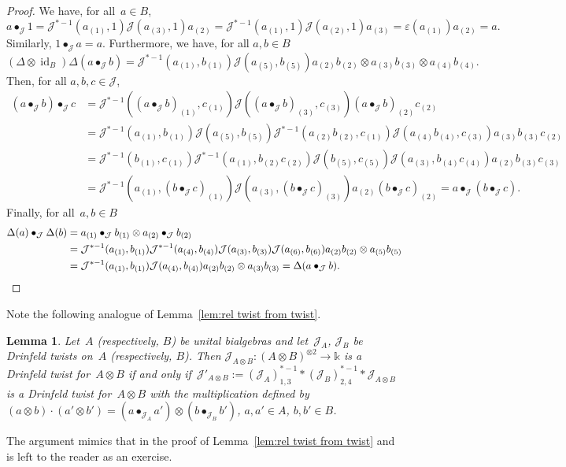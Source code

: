 \documentclass[12pt, reqno]{amsart}
\newtheorem{lemma}[theorem]{Lemma}
\theoremstyle{definition}
\numberwithin{equation}{section}
\newcommand{\tensor}{\otimes}
\newcommand{\kk}{\mathbb{k}}\newcommand{\lie}[1]{{\mathfrak{#1}}}
\DeclareMathOperator{\id}{id}
\begin{document}
\begin{proof}
We have, for all~$a\in B$,
$$
a\bullet_{\mathcal J}1=\mathcal J^{\ast-1}(a_{(1)},1)\mathcal J(a_{(3)},1)a_{(2)}
=\mathcal J^{\ast-1}(a_{(1)},1)\mathcal J(a_{(2)},1)a_{(3)}=\varepsilon(a_{(1)})a_{(2)}=a.
$$
Similarly, $1\bullet_{\mathcal J}a=a$. 
Furthermore, we have, for all $a,b\in B$
$$
(\Delta\tensor\id_B)\Delta(a\bullet_{\mathcal J} b)=
\mathcal J^{\ast-1}(a_{(1)},b_{(1)})\mathcal J(a_{(5)},b_{(5)})a_{(2)}b_{(2)}\tensor a_{(3)}b_{(3)}\tensor a_{(4)}b_{(4)}.
$$
Then, 
for all $a,b,c\in \mathcal J$,
\begin{align*}
(a\bullet_{\mathcal J} b)\bullet_{\mathcal J} c&=
\mathcal J^{\ast-1}((a\bullet_{\mathcal J}b)_{(1)},c_{(1)})
\mathcal J((a\bullet_{\mathcal J}b)_{(3)},c_{(3)})(a\bullet_{\mathcal J}b)_{(2)}c_{(2)}\\
&=\mathcal J^{\ast-1}(a_{(1)},b_{(1)})\mathcal J(a_{(5)},b_{(5)})
\mathcal J^{\ast-1}(a_{(2)}b_{(2)},c_{(1)})\mathcal J(a_{(4)}b_{(4)},c_{(3)})a_{(3)}b_{(3)}c_{(2)}\\
&=\mathcal J^{\ast-1}(b_{(1)},c_{(1)})\mathcal J^{\ast-1}(a_{(1)},b_{(2)}c_{(2)})
\mathcal J(b_{(5)},c_{(5)})\mathcal J(a_{(3)},b_{(4)}c_{(4)})a_{(2)}b_{(3)}c_{(3)}
\\
&=\mathcal J^{\ast-1}(a_{(1)},(b\bullet_{\mathcal J}c)_{(1)})
\mathcal J(a_{(3)},(b\bullet_{\mathcal J}c)_{(3)}) a_{(2)}(b\bullet_{\mathcal J}c)_{(2)}=a\bullet_{\mathcal J}(b\bullet_{\mathcal J}c).
\end{align*}
Finally, for all~$a,b\in B$
\begin{align*}
\Delta(a)\bullet_{\mathcal J}\Delta(b)&=
a_{(1)}\bullet_{\mathcal J}b_{(1)}\tensor 
a_{(2)}\bullet_{\mathcal J}b_{(2)}
\\
&=\mathcal J^{\ast-1}(a_{(1)},b_{(1)})
\mathcal J^{\ast-1}(a_{(4)},b_{(4)})\mathcal J(a_{(3)},b_{(3)})\mathcal J(a_{(6)},b_{(6)})a_{(2)}b_{(2)}\tensor a_{(5)}b_{(5)}\\
&=\mathcal J^{\ast-1}(a_{(1)},b_{(1)})
\mathcal J(a_{(4)},b_{(4)})a_{(2)}b_{(2)}\tensor a_{(3)}b_{(3)}=\Delta(a\bullet_{\mathcal J}b).\qedhere
\end{align*}
\end{proof}
Note the following analogue of Lemma~\ref{lem:rel twist from twist}.
\begin{lemma}\label{lem:dual rel twist from twist}
Let~$A$ (respectively, $B$) be unital bialgebras and let~$\mathcal J_A$, $\mathcal J_B$ be Drinfeld twists on~$A$ (respectively, $B$). 
Then $\mathcal J_{A\tensor B}:(A\tensor B)^{\tensor 2}\to \kk$ is a Drinfeld twist for~$A\tensor B$ if and only if~$\mathcal J'_{A\tensor B}:=(\mathcal J_A)_{1,3}^{\ast-1}
\ast (\mathcal J_B)_{2,4}^{\ast-1}\ast \mathcal J_{A\tensor B}$ is a Drinfeld twist for~$A\tensor B$
with the multiplication defined by~$(a\tensor b)\cdot (a'\tensor b')=(a\bullet_{\mathcal J_A} a')\tensor 
(b\bullet_{\mathcal J_B}b')$, $a,a'\in A$, $b,b'\in B$.
\end{lemma}
The argument mimics that in the proof of Lemma~\ref{lem:rel twist from twist} and is left to the reader as an exercise. 
\end{document}
